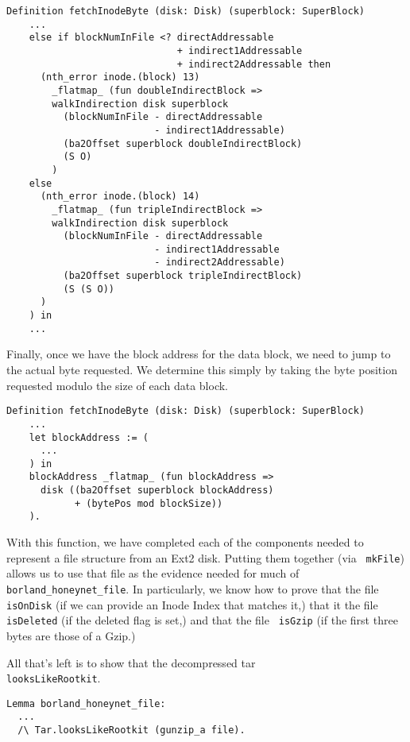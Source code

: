 \documentclass[nocopyrightspace]{sigplanconf}
\begin{document}
\begin{lstlisting}
Definition fetchInodeByte (disk: Disk) (superblock: SuperBlock)
    ...
    else if blockNumInFile <? directAddressable
                              + indirect1Addressable
                              + indirect2Addressable then
      (nth_error inode.(block) 13) 
        _flatmap_ (fun doubleIndirectBlock =>
        walkIndirection disk superblock 
          (blockNumInFile - directAddressable
                          - indirect1Addressable)
          (ba2Offset superblock doubleIndirectBlock)
          (S O)
        )
    else 
      (nth_error inode.(block) 14) 
        _flatmap_ (fun tripleIndirectBlock =>
        walkIndirection disk superblock 
          (blockNumInFile - directAddressable
                          - indirect1Addressable
                          - indirect2Addressable)
          (ba2Offset superblock tripleIndirectBlock) 
          (S (S O))
      )
    ) in
    ...
\end{lstlisting}

Finally, once we have the block address for the data block, we need to jump to
the actual byte requested. We determine this simply by taking the byte
position requested modulo the size of each data block.

\begin{lstlisting}
Definition fetchInodeByte (disk: Disk) (superblock: SuperBlock)
    ...
    let blockAddress := (
      ...
    ) in
    blockAddress _flatmap_ (fun blockAddress =>
      disk ((ba2Offset superblock blockAddress) 
            + (bytePos mod blockSize))
    ).
\end{lstlisting}

With this function, we have completed each of the components needed to
represent a file structure from an Ext2 disk. Putting them together (via {\tt
mkFile}) allows us to use that file as the evidence needed for much of {\tt
borland\_honeynet\_file}. In particularly, we know how to prove that the file
{\tt isOnDisk} (if we can provide an Inode Index that matches it,) that it the
file {\tt isDeleted} (if the deleted flag is set,) and that the file {\tt
isGzip} (if the first three bytes are those of a Gzip.)

All that's left is to show that the decompressed tar \\
{\tt looksLikeRootkit}.

\begin{lstlisting}
Lemma borland_honeynet_file:
  ...
  /\ Tar.looksLikeRootkit (gunzip_a file).
\end{lstlisting}
\end{document}
